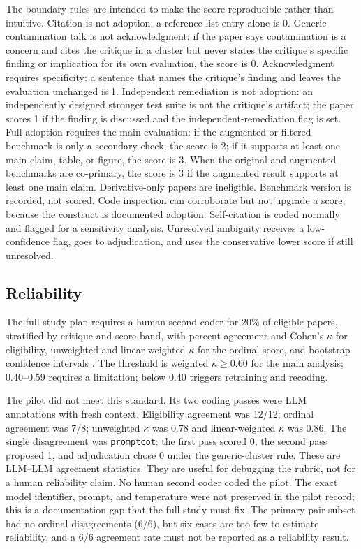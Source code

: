 \documentclass[11pt,a4paper]{article}
\newcommand{\key}[1]{\texttt{\small #1}}
\begin{document}
The boundary rules are intended to make the score reproducible rather than intuitive. Citation is not adoption: a reference-list entry alone is 0. Generic contamination talk is not acknowledgment: if the paper says contamination is a concern and cites the critique in a cluster but never states the critique's specific finding or implication for its own evaluation, the score is 0. Acknowledgment requires specificity: a sentence that names the critique's finding and leaves the evaluation unchanged is 1. Independent remediation is not adoption: an independently designed stronger test suite is not the critique's artifact; the paper scores 1 if the finding is discussed and the independent-remediation flag is set. Full adoption requires the main evaluation: if the augmented or filtered benchmark is only a secondary check, the score is 2; if it supports at least one main claim, table, or figure, the score is 3. When the original and augmented benchmarks are co-primary, the score is 3 if the augmented result supports at least one main claim. Derivative-only papers are ineligible. Benchmark version is recorded, not scored. Code inspection can corroborate but not upgrade a score, because the construct is documented adoption. Self-citation is coded normally and flagged for a sensitivity analysis. Unresolved ambiguity receives a low-confidence flag, goes to adjudication, and uses the conservative lower score if still unresolved.

\subsection{Reliability}

The full-study plan requires a human second coder for 20\% of eligible papers, stratified by critique and score band, with percent agreement and Cohen's $\kappa$ for eligibility, unweighted and linear-weighted $\kappa$ for the ordinal score, and bootstrap confidence intervals \citep{cohen1960}. The threshold is weighted $\kappa \ge 0.60$ for the main analysis; 0.40--0.59 requires a limitation; below 0.40 triggers retraining and recoding.

The pilot did not meet this standard. Its two coding passes were LLM annotations with fresh context. Eligibility agreement was 12/12; ordinal agreement was 7/8; unweighted $\kappa$ was 0.78 and linear-weighted $\kappa$ was 0.86. The single disagreement was \key{promptcot}: the first pass scored 0, the second pass proposed 1, and adjudication chose 0 under the generic-cluster rule. These are LLM--LLM agreement statistics. They are useful for debugging the rubric, not for a human reliability claim. No human second coder coded the pilot. The exact model identifier, prompt, and temperature were not preserved in the pilot record; this is a documentation gap that the full study must fix. The primary-pair subset had no ordinal disagreements (6/6), but six cases are too few to estimate reliability, and a 6/6 agreement rate must not be reported as a reliability result.
\end{document}

